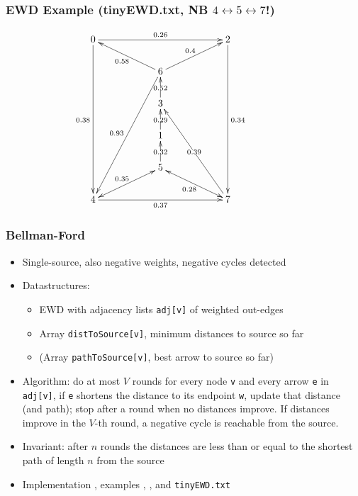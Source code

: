 \documentclass[handout]{beamer}
\newcommand{\git}{https://github.com/marcbezem/INF102/blob/master}
\begin{document}
\begin{frame}
    \frametitle{EWD Example (tinyEWD.txt, NB $4\leftrightarrow 5\leftrightarrow 7$!)}
\[
\xymatrix@R=0.7cm@C=2cm{
0\ar[ddddd]_{0.38}\ar[rr]^{0.26}&&2\ar[ddddd]^{0.34}&\\
  &6\ar[ru]^{0.4}\ar[lu]^{0.58}\ar[ldddd]_{0.93}&&\\
  &3\ar[u]|{0.52}&&\\
  &1\ar[u]|{0.29}&&\\
  &5\ar[u]|{0.32}&&\\
4\ar[rr]_{0.37}\ar@{<->}[ru]^{0.35}&& 7\ar@{<->}[lu]^{0.28}\ar[luuu]|{0.39}&\\
}
\]
\end{frame}


\begin{frame}
    \frametitle{Bellman-Ford}

\begin{itemize}[<+->]
\item Single-source, also negative weights, negative cycles detected
\item Datastructures:
  \begin{itemize}
  \item EWD with adjacency lists {\tt adj[v]} of weighted out-edges
  \item Array {\tt distToSource[v]}, minimum distances to source so far
  \item (Array {\tt pathToSource[v]}, best arrow to source so far)
\end{itemize}
\item Algorithm: do at most $V$ rounds for every node {\tt v} 
and every arrow {\tt e} in {\tt adj[v]}, if {\tt e} shortens the
distance to its endpoint {\tt w}, update that distance (and path);
stop after a round when no distances improve. If distances improve in the
$V$-th round, a negative cycle is reachable from the source.
\item Invariant: after $n$ rounds the distances are less than or
equal to the shortest path of length $n$ from the source
\item Implementation 
\href{\git/programs/graphs/LinkedListEWD.java}%
{\color{red}{\tt LinkedListEWD.simpleBF()}}, examples 
\href{\git/programs/myEWD.txt}%
{\color{red}{\tt myEWD.txt}},
\href{\git/programs/tinyJob.txt}%
{\color{red}{\tt tinyJob.txt}},
\href{\git/programs/tiNoJob.txt}%
{\color{red}{\tt tiNoJob.txt}} and {\tt tinyEWD.txt}
\end{itemize} 
\end{frame}
\end{document}
